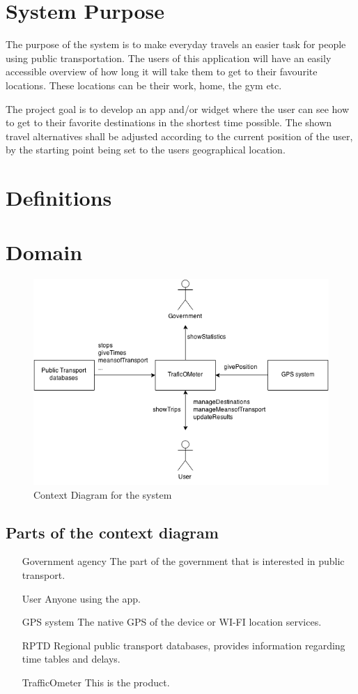 \documentclass[a4paper]{article}
\begin{document}
	\section{System Purpose} %
	The purpose of the system is to make everyday travels an easier task for people using public transportation. The users of this application will have an easily accessible overview of how long it will take them to get to their favourite locations. These locations can be their work, home, the gym etc.
	
	
The project goal is to develop an app and/or widget where the user can see how to get to their favorite destinations in the shortest time possible. The shown travel alternatives shall be adjusted according to the current position of the user, by the starting point being set to the users geographical location.
	\section{Definitions}
		
	\section{Domain}
		\begin{figure}[h]
				\includegraphics[scale=0.65]{img/Context-v1.png}
			\caption{Context Diagram for the system}
		\end{figure}
		\subsection{Parts of the context diagram} %
		\label{sub:parts_of_the_context_diagram}
		\begin{itemize}
			\item[Government agency] The part of the government that is interested in public transport. 
			\item[User] Anyone using the app.
			\item[GPS system] The native GPS of the device or WI-FI location services.
			\item[RPTD] Regional public transport databases, provides information regarding time tables and delays.
			\item[TrafficOmeter] This is the product.
		\end{itemize}
\end{document}
